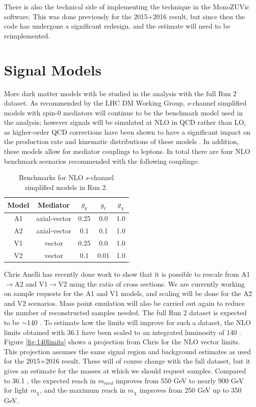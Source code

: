 There is also the technical side of implementing the \gjets technique in the MonoZUVic software. This was done previously for the 2015+2016 result, but since then the code has undergone a significant redesign, and the \gjets estimate will need to be reimplemented.

\section{Signal Models}

More dark matter models with be studied in the \monoZ analysis with the full Run 2 dataset. As recommended by the LHC DM Working Group, $s$-channel simplified models with spin-0 mediators will continue to be the benchmark model used in the analysis; however signals will be simulated at NLO in QCD rather than LO, as higher-order QCD corrections have been shown to have a significant impact on the production rate and kinematic distributions of these models \cite{Backovic:2015soa}. In addition, these models allow for mediator couplings to leptons. In total there are four NLO benchmark scenarios recommended \cite{Albert:2017onk} with the following couplings:

\begin{table}[h]
\centering
\begin{tabular}{ccccc}
\hline \hline
Model & Mediator     & $g_q$ & $g_\ell$ & $g_\chi$ \\ \hline \hline
A1    & axial-vector & 0.25  & 0.0      & 1.0      \\ \hline
A2    & axial-vector & 0.1   & 0.1      & 1.0      \\ \hline
V1    & vector       & 0.25  & 0.0      & 1.0      \\ \hline
V2    & vector       & 0.1   & 0.01     & 1.0    \\ \hline \hline
\end{tabular}
\caption{Benchmarks for NLO $s$-channel simplified models in Run 2.}
\label{tbl:nloSimp}
\end{table}

\noindent Chris Anelli has recently done work to show that it is possible to rescale from A1$\rightarrow$A2 and V1$\rightarrow$V2 using the ratio of cross sections. We are currently working on sample requests for the A1 and V1 models, and scaling will be done for the A2 and V2 scenarios. Mass point emulation will also be carried out again to reduce the number of reconstructed samples needed. The full Run 2 dataset is expected to be $\sim$140 \ifb. To estimate how the limits will improve for such a dataset, the NLO limits obtained with 36.1 \ifb have been scaled to an integrated luminosity of 140 \ifb. Figure \ref{fig:140limits} shows a projection from Chris for the NLO vector limits. This projection assumes the same signal region and background estimates as used for the 2015+2016 result. These will of course change with the full dataset, but it gives an estimate for the masses at which we should request samples. Compared to 36.1 \ifb, the expected reach in $m_{med}$ improves from 550 GeV to nearly 900 GeV for light $m_\chi$, and the maximum reach in $m_\chi$ improves from 250 GeV up to 350 GeV.

